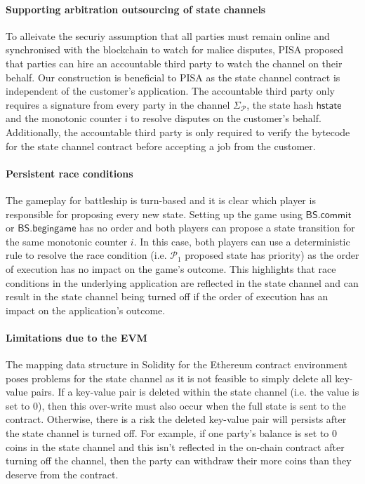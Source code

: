 \documentclass{llncs}
\newcommand{\hstate}{\mathsf{hstate}}
\newcommand{\monotoniccounter}{\mathsf{i}}
\newcommand{\participant}{\mathcal{P}}
\newcommand{\battleshipbegin}{\mathsf{BS.begingame}}
\newcommand{\battleshipcommit}{\mathsf{BS.commit}}
\begin{document}
\paragraph{Supporting arbitration outsourcing of state channels} 
To alleivate the securiy assumption that all parties must remain online and synchronised with the blockchain to watch for malice disputes, PISA proposed that parties can hire an accountable third party to watch the channel on their behalf. 
Our construction is beneficial to PISA as the state channel contract is independent of the customer's application. 
The accountable third party only requires a signature from every party in the channel $\Sigma_{\participant}$, the state hash $\hstate$ and the monotonic counter $\monotoniccounter$ to resolve disputes on the customer's behalf. 
Additionally,  the accountable third party is only required to verify the bytecode for the state channel contract before accepting a job from the customer. 

\paragraph{Persistent race conditions} 
The gameplay for battleship is turn-based and it is clear which player is responsible for proposing every new state. 
Setting up the game using $\battleshipcommit$ or $\battleshipbegin$ has no order and both players can propose a state transition for the same monotonic counter $i$. 
In this case, both players can use a deterministic rule to resolve the race condition (i.e. $\participant_{1}$ proposed state has priority) as the order of execution has no impact on the game's outcome. 
This highlights that race conditions in the underlying application are reflected in the state channel and can result in the state channel being turned off if the order of execution has an impact on the application's outcome. 

\paragraph{Limitations due to the EVM} 
The mapping data structure in Solidity for the Ethereum contract environment poses problems for the state channel as it is not feasible to simply delete all key-value pairs. 
If a key-value pair is deleted within the state channel (i.e. the value is set to 0), then this over-write must also occur when the full state is sent to the contract. 
Otherwise, there is a risk the deleted key-value pair will persists after the state channel is turned off.
For example, if one party's balance is set to 0 coins in the state channel and this isn't reflected in the on-chain contract after turning off the channel, then the party can withdraw their more coins than they deserve from the contract. 
\end{document}
